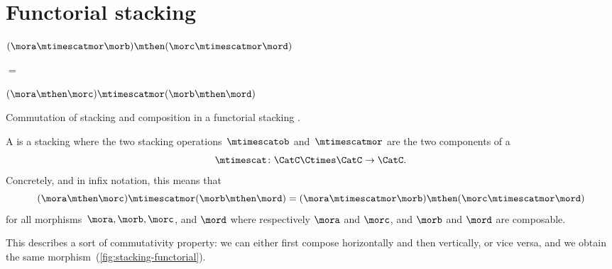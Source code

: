 \begin{gradedexercise}
\begin{enumerate}
    \end{enumerate}
\end{gradedexercise}


\section{Functorial stacking}
\label{sec:functorial-stacking}

\begin{marginfigure}
    \centering
    $(\mora \mtimescatmor \morb )
        \mthen (\morc \mtimescatmor \mord )$

    \vspace{3mm}

    $=$

    \vspace{3mm}
    \vspace{3mm}
    $(\mora \mthen \morc ) \mtimescatmor (\morb \mthen \mord )$

    \caption{Commutation of stacking and composition in a functorial stacking . }
    \label{fig:stacking-functorial}
\end{marginfigure}

\begin{ctdefinition}
    \label{def:functorial-stacking-semi-cat}
    A  is a stacking  where the two stacking operations~$\mtimescatob$ and~$\mtimescatmor$ are the two components of a  \begin{equation}
        \mtimescat\colon \CatC \Ctimes \CatC \to \CatC.
    \end{equation}
    Concretely, and in infix notation, this means that
    \begin{equation}
        (\mora \mthen \morc )
        \mtimescatmor (\morb \mthen \mord )
        =
        (\mora \mtimescatmor \morb )
        \mthen (\morc \mtimescatmor \mord )
    \end{equation}
    for all morphisms~$\mora, \morb, \morc$, and $\mord$ where respectively $\mora$ and $\morc$, and $\morb$ and $\mord$ are composable.
\end{ctdefinition}

%
This describes a sort of commutativity property: we can either first compose horizontally and then vertically, or vice versa, and we obtain the same morphism~(\cref{fig:stacking-functorial}).

